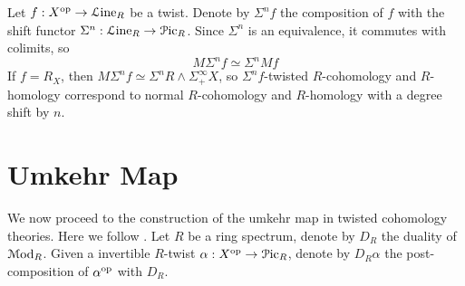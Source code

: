 \documentclass[10pt]{amsart}
\begin{document}
\begin{example}
	Let $f:X^{\mathrm{op}}\to\mathcal{L}\mathrm{ine}_R$ be a twist. Denote by $\Sigma^nf$ the composition of $f$ with the shift functor $\Sigma^n:\mathcal{L}\mathrm{ine}_R\to\mathcal{P}\mathrm{ic}_R$. Since $\Sigma^n$ is an equivalence, it commutes with colimits, so $$M\Sigma^nf\simeq \Sigma^nMf$$If $f=R_X$, then $M\Sigma^nf\simeq \Sigma^nR\wedge\Sigma^\infty_+X$, so  $\Sigma^nf$-twisted $R$-cohomology and $R$-homology correspond to normal $R$-cohomology and $R$-homology with a degree shift by $n$. 
\end{example}

\section{Umkehr Map}
We now proceed to the construction of the umkehr map in twisted cohomology theories. Here we follow \cite{abg2018thom}. Let $R$ be a ring spectrum, denote by $D_R$ the duality of $\mathcal{M}\mathrm{od}_R$. Given a invertible $R$-twist $\alpha:X^{\mathrm{op}}\to\mathcal{P}\mathrm{ic}_R$, denote by $D_R\alpha$ the post-composition of $\alpha^{\mathrm{op}}$ with $D_R$.
\end{document}
